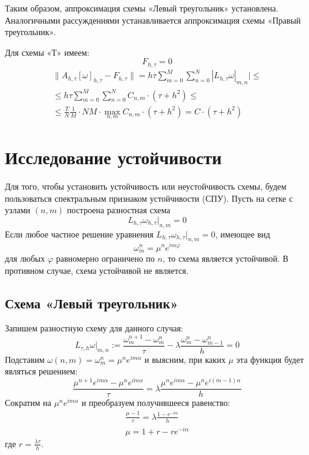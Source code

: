 \documentclass[titlepage]{article}
\def\le{\leqslant}
\begin{document}
Таким образом, аппроксимация схемы «Левый треугольник» установлена. Аналогичными рассуждениями устанавливается аппроксимация схемы «Правый треугольник».

Для схемы «Т» имеем:
$$F_{h,\tau} = 0$$
\begin{multline*}
	\|A_{h,\tau}[\omega]_{h,\tau} - F_{h,\tau}\| = h\tau\sum_{m=0}^{M}\sum_{n=0}^{N}{|L_{h,\tau}\omega|_{m,n}|} \le \\
	\le h\tau\sum_{m=0}^{M}\sum_{n=0}^{N}{C_{n,m}\cdot(\tau+h^2)} \le \\
	\le \frac{T}{N}\frac{1}{M} \cdot NM \cdot \max_{n,m}{C_{n,m}} \cdot (\tau+h^2) = C \cdot (\tau+h^2)
\end{multline*}

\section{Исследование устойчивости}
Для того, чтобы установить устойчивость или неустойчивость схемы, будем пользоваться спектральным признаком устойчивости (СПУ). 
Пусть на сетке с узлами $(n,m)$ построена разностная схема
$$L_{h,\tau}\omega_{h,\tau}|_{n,m} = 0$$
Если любое частное решение уравнения $L_{h,\tau}\omega_{h,\tau}|_{n,m} = 0$, имеющее вид 
$$\omega_m^n = \mu^ne^{im\varphi}$$ 
для любых $\varphi$ равномерно ограничено по $n$, то схема является устойчивой. В противном случае, схема устойчивой не является.

\subsection{Схема «Левый треугольник»}
Запишем разностную схему для данного случая:
\begin{equation*}
	L_{\tau,h}{\omega} |_{m,n} := \frac{\omega_m^{n+1} - \omega_m^n}{\tau} - \lambda\frac{\omega_m^n - \omega_{m-1}^n}{h} = 0
\end{equation*}
Подставим $\omega(n,m) = \omega_m^n = \mu^ne^{im\alpha}$ и выясним, при каких $\mu$ эта функция будет являться решением:
\begin{equation*}
	\frac{\mu^{n+1}e^{im\alpha} - \mu^ne^{im\alpha}}{\tau} = \lambda\frac{\mu^ne^{im\alpha} - \mu^ne^{i(m-1)\alpha}}{h}
\end{equation*}
Сократим на $\mu^ne^{im\alpha}$ и преобразуем получившееся равенство:
\begin{gather*}
	\frac{\mu-1}{\tau} = \lambda\frac{1-e^{-i\alpha}}{h} \\
	\mu = 1 + r - re^{-i\alpha}
\end{gather*}
где $r = \frac{\lambda\tau}{h}$.
\end{document}
